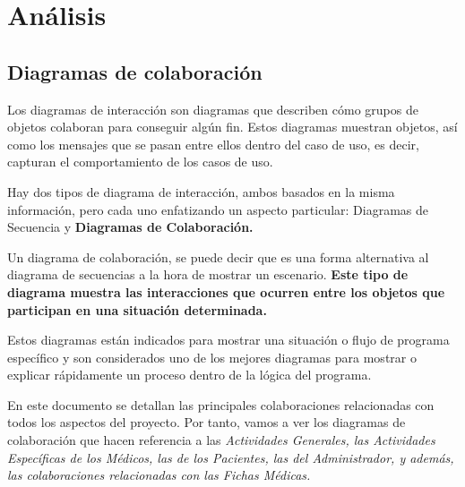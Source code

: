 \documentclass[a4paper,oneside,11pt]{book}
\begin{document}
	
\chapter{Análisis} %
\label{cha:analisis}


	\section{Diagramas de colaboración} %
	\label{sec:diagramas_de_colaboracion}
	
		Los diagramas de interacción son diagramas que describen cómo grupos de objetos colaboran para conseguir algún fin. Estos diagramas muestran objetos, así como los mensajes que se pasan entre ellos dentro del caso de uso, es decir, capturan el comportamiento de los casos de uso.
		
		Hay dos tipos de diagrama de interacción, ambos basados en la misma información, pero cada uno enfatizando un aspecto particular: Diagramas de Secuencia y \textbf{Diagramas de Colaboración.}
	
		Un diagrama de colaboración, se puede decir que es una forma alternativa al diagrama de secuencias a la hora de mostrar un escenario. \textbf{Este tipo de diagrama muestra las interacciones que ocurren entre los objetos que participan en una situación determinada.}

		\medskip
		
		
		\medskip
			
		Estos diagramas están indicados para mostrar una situación o flujo de programa específico y son considerados uno de los mejores diagramas para mostrar o explicar rápidamente un proceso dentro de la lógica del programa.
		
		En este documento se detallan las principales colaboraciones relacionadas con todos los aspectos del proyecto. Por tanto, vamos a ver los diagramas de colaboración que hacen referencia a las \textit{Actividades Generales, las Actividades Específicas de los Médicos, las de los Pacientes, las del Administrador, y además, las colaboraciones relacionadas con las Fichas Médicas.}
		
\end{document}
